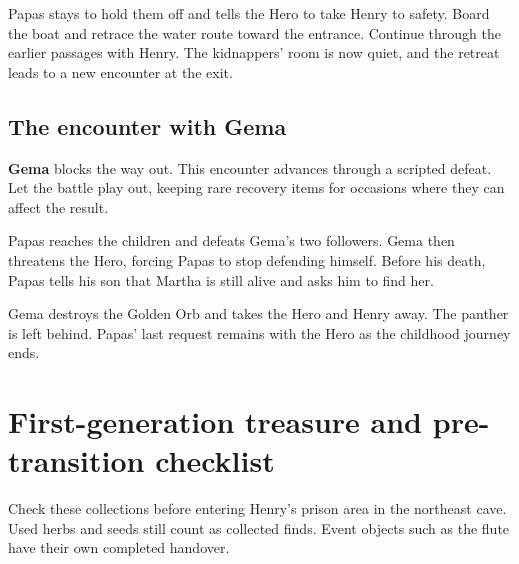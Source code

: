 
Papas stays to hold them off and tells the Hero to take Henry to safety.
Board the boat and retrace the water route toward the entrance. Continue
through the earlier passages with Henry. The kidnappers' room is now quiet,
and the retreat leads to a new encounter at the exit.

\subsection*{The encounter with Gema}

\textbf{Gema} blocks the way out. This encounter advances through a
scripted defeat. Let the battle play out, keeping rare recovery items
for occasions where they can affect the result.

Papas reaches the children and defeats Gema's two followers. Gema then
threatens the Hero, forcing Papas to stop defending himself. Before his
death, Papas tells his son that Martha is still alive and asks him to
find her.

Gema destroys the Golden Orb and takes the Hero and Henry away.
The panther is left behind. Papas' last request remains with the Hero
as the childhood journey ends.

\section{First-generation treasure and pre-transition checklist}

Check these collections before entering Henry's prison area in the
northeast cave. Used herbs and seeds still count as collected finds.
Event objects such as the flute have their own completed handover.

